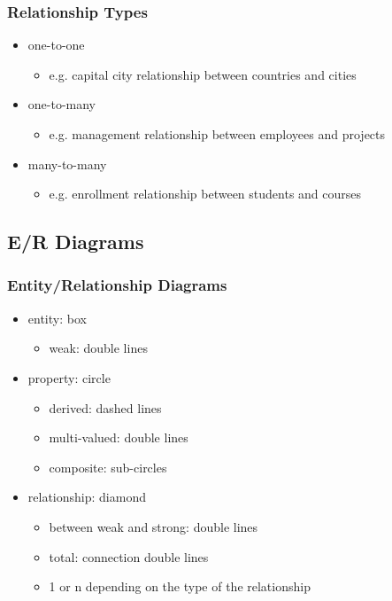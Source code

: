 \documentclass[dvipsnames]{beamer}
\begin{document}
\begin{frame}
  \frametitle{Relationship Types}

  \begin{itemize}
    \item \alert{one-to-one}
    \begin{itemize}
      \item e.g. capital city relationship between countries and cities
    \end{itemize}

    \pause
    \medskip
    \item \alert{one-to-many}
    \begin{itemize}
      \item e.g. management relationship between employees and projects
    \end{itemize}

    \pause
    \medskip
    \item \alert{many-to-many}
    \begin{itemize}
      \item e.g. enrollment relationship between students and courses
    \end{itemize}
  \end{itemize}
\end{frame}

\subsection{E/R Diagrams}

\begin{frame}
  \frametitle{Entity/Relationship Diagrams}

  \begin{itemize}
    \item entity: box
    \begin{itemize}
      \item weak: double lines
    \end{itemize}

    \pause
    \item property: circle
    \begin{itemize}
      \item derived: dashed lines
      \item multi-valued: double lines
      \item composite: sub-circles
    \end{itemize}

    \pause
    \item relationship: diamond
    \begin{itemize}
      \item between weak and strong: double lines
      \item total: connection double lines
      \item 1 or n depending on the type of the relationship
    \end{itemize}
 \end{itemize}
\end{frame}
\end{document}
